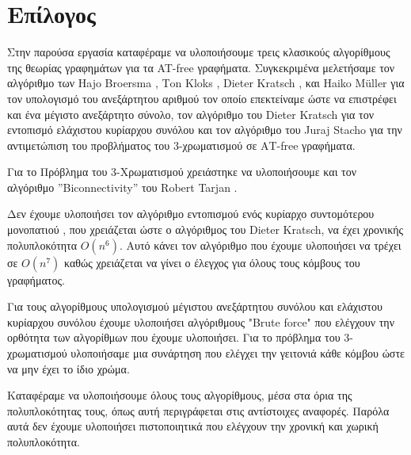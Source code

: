 \chapter{Επίλογος}
\label{ch:Conclusion}

Στην παρούσα εργασία καταφέραμε να υλοποιήσουμε τρεις κλασικούς αλγορίθμους της θεωρίας γραφημάτων για 
τα AT-free γραφήματα. Συγκεκριμένα μελετήσαμε τον αλγόριθμο των Ηajo Βroersma , Τon Κloks , Dieter Kratsch , και Ηaiko Μüller\cite{at-free-independent-sets} για τον υπολογισμό του ανεξάρτητου αριθμού τον οποίο επεκτείναμε ώστε να επιστρέφει και ένα μέγιστο ανεξάρτητο σύνολο, τον αλγόριθμο του Dieter Kratsch\cite{at-free-domination} για τον εντοπισμό ελάχιστου κυρίαρχου συνόλου και τον αλγόριθμο του Juraj Stacho\cite{at-free-3-colouring}  για την αντιμετώπιση του προβλήματος του 3-χρωματισμού σε ΑΤ-free γραφήματα.

Για το Πρόβλημα του 3-Χρωματισμού χρειάστηκε να υλοποιήσουμε και τον αλγόριθμο ”Biconnectivity” του Robert Tarjan \cite{tarjan-depth-first-search}.

Δεν έχουμε υλοποιήσει τον αλγόριθμο εντοπισμού ενός κυρίαρχο συντομότερου
μονοπατιού \cite{corneil-olariu-stewart-asteroidal-triple-free-graphs}, που χρειάζεται ώστε ο αλγόριθμος του Dieter Kratsch\cite{at-free-domination}, να έχει χρονικής πολυπλοκότητα $O(n^6)$. Αυτό κάνει τον αλγόριθμο που έχουμε υλοποιήσει να τρέχει σε $O(n^7)$ καθώς χρειάζεται να γίνει ο έλεγχος για όλους τους κόμβους του γραφήματος. 

Για τους αλγορίθμους υπολογισμού μέγιστου ανεξάρτητου συνόλου και ελάχιστου κυρίαρχου συνόλου έχουμε υλοποιήσει αλγόριθμους "Brute force" που ελέγχουν την ορθότητα των αλγορίθμων που έχουμε υλοποιήσει. 
Για το πρόβλημα του 3-χρωματισμού υλοποιήσαμε μια συνάρτηση που ελέγχει την γειτονιά κάθε κόμβου ώστε να μην έχει το ίδιο χρώμα.

Καταφέραμε να υλοποιήσουμε όλους τους αλγορίθμους, μέσα στα όρια της πολυπλοκότητας τους, όπως αυτή περιγράφεται στις αντίστοιχες αναφορές. Παρόλα αυτά δεν έχουμε υλοποιήσει πιστοποιητικά που ελέγχουν την χρονική και χωρική πολυπλοκότητα.     